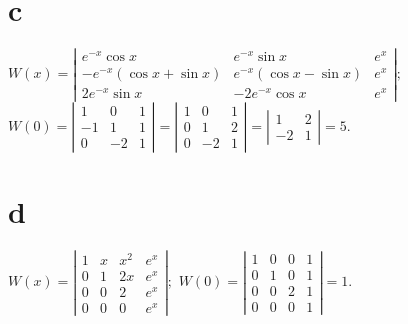 \documentclass[dvips]{book}
\numberwithin{example}{section}
\numberwithin{equation}{section}
\numberwithin{theorem}{section}
\numberwithin{table}{section}
\numberwithin{figure}{section}
\begin{document}
\part{c}
$
W(x)=\left|\begin{array}{ccc}
e^{-x}\cos x&e^{-x}\sin x&e^x\\
-e^{-x}(\cos x+\sin x)&e^{-x}(\cos x-\sin x)&e^x\\
2e^{-x}\sin x&-2e^{-x}\cos x&
e^x\end{array}\right|;
$
$
W(0)=\left|\begin{array}{rrc}
1&0&1\\-1&1&1\\0&-2&1
\end{array}\right|=
\left|\begin{array}{rrc}
1&0&1\\0&1&2\\0&-2&1
\end{array}\right|=
\left|\begin{array}{rcc}
1&2\\-2&1\end{array}\right|=5.
$

\part{d}
$
W(x)=\left|\begin{array}{cccc}
1&x&x^2&e^x\\
0&1&2x&e^x\\0&0&2&e^x\\0&0&0&e^x\end{array}\right|;
$
$
W(0)=\left|\begin{array}{cccc}
1&0&0&1\\0&1&0&1\\0&0&2&1\\0&0&0&1
\end{array}\right|=1.
$
\end{document}
